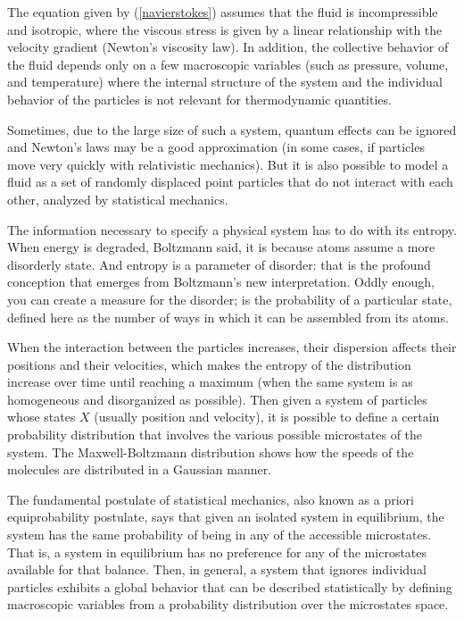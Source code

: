     The equation given by (\ref{navierstokes}) assumes that the fluid is incompressible and isotropic, where the viscous stress is given by a linear relationship with the velocity gradient (Newton's viscosity law). In addition, the collective behavior of the fluid depends only on a few macroscopic variables (such as pressure, volume, and temperature) where the internal structure of the system and the individual behavior of the particles is not relevant for thermodynamic quantities. 
    
    Sometimes, due to the large size of such a system, quantum effects can be ignored and Newton's laws may be a good approximation (in some cases, if particles move very quickly with relativistic mechanics). But it is also possible to model a fluid as a set of randomly displaced point particles that do not interact with each other, analyzed by statistical mechanics.
    
    The information necessary to specify a physical system has to do with its entropy. When energy is degraded, Boltzmann said, it is because atoms assume a more disorderly state. And entropy is a parameter of disorder: that is the profound conception that emerges from Boltzmann's new interpretation. Oddly enough, you can create a measure for the disorder; is the probability of a particular state, defined here as the number of ways in which it can be assembled from its atoms. 
    
    When the interaction between the particles increases, their dispersion affects their positions and their velocities, which makes the entropy of the distribution increase over time until reaching a maximum (when the same system is as homogeneous and disorganized as possible). Then given a system of particles whose states $ X $ (usually position and velocity), it is possible to define a certain probability distribution that involves the various possible microstates of the system. The Maxwell-Boltzmann distribution shows how the speeds of the molecules are distributed in a Gaussian manner.
    
    The fundamental postulate of statistical mechanics, also known as a priori equiprobability postulate, says that given an isolated system in equilibrium, the system has the same probability of being in any of the accessible microstates. That is, a system in equilibrium has no preference for any of the microstates available for that balance. Then, in general, a system that ignores individual particles exhibits a global behavior that can be described statistically by defining macroscopic variables from a probability distribution over the microstates space.
    
